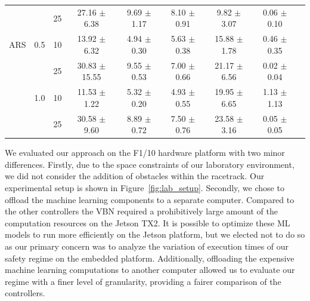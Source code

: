 \documentclass[manuscript,screen,review]{acmart}
\newcommand{\ttj}[1]{\textcolor{red}{\textbf{\underline{TTJ:}} #1}}
\newcommand{\figref}[1]{Figure~\ref{#1}}
\begin{document}
\begin{table}[ht]
{\begin{tabular}{ccccccccc}
    &     & 25 &  27.16 $\pm$   6.38 &    9.69 $\pm$  1.17 &           8.10 $\pm$  0.91 &     9.82 $\pm$  3.07 &                    0.06 $\pm$  0.10 \\
ARS & 0.5 & 10 &  13.92 $\pm$   6.32 &    4.94 $\pm$  0.30 &           5.63 $\pm$  0.38 &    15.88 $\pm$  1.78 &                    0.46 $\pm$  0.35 \\
    &     & 25 &  30.83 $\pm$  15.55 &    9.55 $\pm$  0.53 &           7.00 $\pm$  0.66 &    21.17 $\pm$  6.56 &                    0.02 $\pm$  0.04 \\
    & 1.0 & 10 &  11.53 $\pm$   1.22 &    5.32 $\pm$  0.20 &           4.93 $\pm$  0.55 &    19.95 $\pm$  6.65 &                    1.13 $\pm$  1.13 \\
    &     & 25 &  30.58 $\pm$   9.60 &    8.89 $\pm$  0.72 &           7.50 $\pm$  0.76 &    23.58 $\pm$  3.16 &                    0.05 $\pm$  0.05 \\
\end{tabular}}%
\end{table}


We evaluated our approach on the F1/10 hardware platform with two minor differences. Firstly, due to the space constraints of our laboratory environment, we did not consider the addition of obstacles within the racetrack. Our experimental setup is shown in \figref{fig:lab_setup}. Secondly, we chose to offload the machine learning components to a separate computer. Compared to the other controllers the VBN required a prohibitively large amount of the computation resources on the Jetson TX2. It is possible to optimize these ML models to run more efficiently on the Jetson platform, but we elected not to do so as our primary concern was to analyze the variation of execution times of our safety regime on the embedded platform. Additionally, offloading the expensive machine learning computations to another computer allowed us to evaluate our regime with a finer level of granularity, providing a fairer comparison of the controllers.








\end{document}
